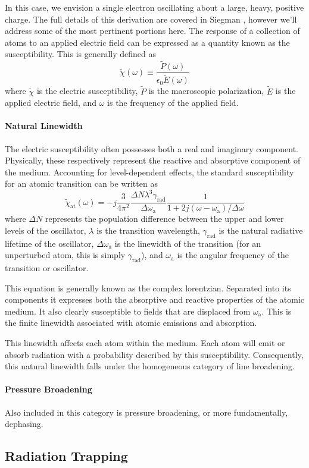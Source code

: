 In this case, we envision a single electron oscillating about a large, heavy,
positive charge. The full details of this derivation are covered in Siegman
\cite{Siegman1986}, however we'll address some of the most pertinent portions
here. The response of a collection of atoms to an applied electric field can be
expressed as a quantity known as the susceptibility. This is generally defined
as
\begin{equation}
    \tilde{\chi}(\omega) \equiv
    \frac{\tilde{P}(\omega)}{\epsilon_0\tilde{E}(\omega)}
\end{equation}
where $\tilde{\chi}$ is the electric susceptibility, $\tilde{P}$ is the
macroscopic polarization, $\tilde{E}$ is the applied electric field, and
$\omega$ is the frequency of the applied field.

\paragraph{Natural Linewidth}
The electric susceptibility often possesses both a real and imaginary component.
Physically, these respectively represent the reactive and absorptive component
of the medium. Accounting for level-dependent effects, the standard
susceptibility for an atomic transition can be written as
\begin{equation}
    \tilde{\chi}_\mathrm{at}(\omega) = -j\frac{3}{4\pi^2}\frac{\Delta
    N\lambda^3\gamma_\mathrm{rad}}{\Delta\omega_\mathrm{a}}\frac{1}{1
    + 2j(\omega - \omega_\mathrm{a})/\Delta\omega}
\end{equation}
where $\Delta N$ represents the population difference between the upper and
lower levels of the oscillator, $\lambda$ is the transition wavelength,
$\gamma_\mathrm{rad}$ is the natural radiative lifetime of the oscillator,
$\Delta\omega_\mathrm{a}$ is the linewidth of the transition (for an unperturbed
atom, this is simply $\gamma_\mathrm{rad}$), and $\omega_\mathrm{a}$ is the
angular frequency of the transition or oscillator.

This equation is generally known as the complex lorentzian. Separated into its
components it expresses both the absorptive and reactive properties of the
atomic medium. It also clearly susceptible to fields that are displaced from
$\omega_\mathrm{a}$. This is the finite linewidth associated with atomic
emissions and absorption.

This linewidth affects each atom within the medium. Each atom will emit or
absorb radiation with a probability described by this susceptibility.
Consequently, this natural linewidth falls under the homogeneous category of
line broadening.

\paragraph{Pressure Broadening}
Also included in this category is pressure broadening, or more fundamentally,
dephasing. 

\subsection{Radiation Trapping}
